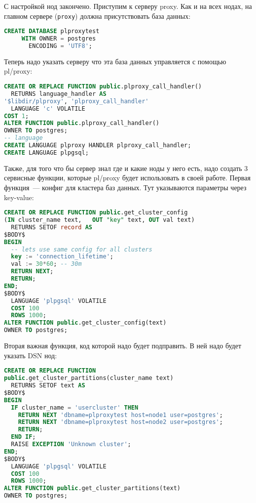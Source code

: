 С настройкой нод закончено. Приступим к серверу proxy. Как и на всех нодах, на главном сервере (\lstinline!proxy!) должна присутствовать база данных:

\begin{lstlisting}[language=SQL,label=lst:plproxy5,caption=Настройка]
CREATE DATABASE plproxytest
     WITH OWNER = postgres
       ENCODING = 'UTF8';
\end{lstlisting}

Теперь надо указать серверу что эта база данных управляется с помощью pl/proxy:

\begin{lstlisting}[language=SQL,label=lst:plproxy6,caption=Настройка]
CREATE OR REPLACE FUNCTION public.plproxy_call_handler()
  RETURNS language_handler AS
'$libdir/plproxy', 'plproxy_call_handler'
  LANGUAGE 'c' VOLATILE
COST 1;
ALTER FUNCTION public.plproxy_call_handler()
OWNER TO postgres;
-- language
CREATE LANGUAGE plproxy HANDLER plproxy_call_handler;
CREATE LANGUAGE plpgsql;
\end{lstlisting}

Также, для того что бы сервер знал где и какие ноды у него есть, надо создать 3 сервисные функции, которые pl/proxy будет использовать в своей работе. Первая функция~--- конфиг для кластера баз данных. Тут указываются параметры через key-value:

\begin{lstlisting}[language=SQL,label=lst:plproxy7,caption=Настройка]
CREATE OR REPLACE FUNCTION public.get_cluster_config
(IN cluster_name text,   OUT "key" text, OUT val text)
  RETURNS SETOF record AS
$BODY$
BEGIN
  -- lets use same config for all clusters
  key := 'connection_lifetime';
  val := 30*60; -- 30m
  RETURN NEXT;
  RETURN;
END;
$BODY$
  LANGUAGE 'plpgsql' VOLATILE
  COST 100
  ROWS 1000;
ALTER FUNCTION public.get_cluster_config(text)
OWNER TO postgres;
\end{lstlisting}

Вторая важная функция, код которой надо будет подправить. В ней надо будет указать DSN нод:

\begin{lstlisting}[language=SQL,label=lst:plproxy8,caption=Настройка]
CREATE OR REPLACE FUNCTION
public.get_cluster_partitions(cluster_name text)
  RETURNS SETOF text AS
$BODY$
BEGIN
  IF cluster_name = 'usercluster' THEN
    RETURN NEXT 'dbname=plproxytest host=node1 user=postgres';
    RETURN NEXT 'dbname=plproxytest host=node2 user=postgres';
    RETURN;
  END IF;
  RAISE EXCEPTION 'Unknown cluster';
END;
$BODY$
  LANGUAGE 'plpgsql' VOLATILE
  COST 100
  ROWS 1000;
ALTER FUNCTION public.get_cluster_partitions(text)
OWNER TO postgres;
\end{lstlisting}

